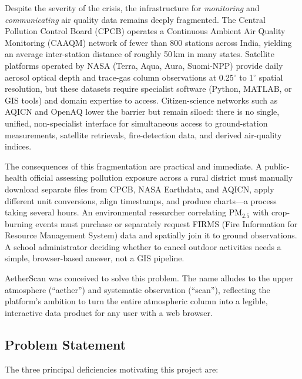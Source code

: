 \documentclass[12pt,a4paper]{article}
\begin{document}
Despite the severity of the crisis, the infrastructure for \emph{monitoring}
and \emph{communicating} air quality data remains deeply fragmented. The
Central Pollution Control Board (CPCB) operates a Continuous Ambient Air
Quality Monitoring (CAAQM) network of fewer than 800 stations across India,
yielding an average inter-station distance of roughly 50\,km in many states.
Satellite platforms operated by NASA (Terra, Aqua, Aura, Suomi-NPP) provide
daily aerosol optical depth and trace-gas column observations at 0.25$^\circ$
to 1$^\circ$ spatial resolution, but these datasets require specialist software
(Python, MATLAB, or GIS tools) and domain expertise to access. Citizen-science
networks such as AQICN and OpenAQ lower the barrier but remain siloed: there
is no single, unified, non-specialist interface for simultaneous access to
ground-station measurements, satellite retrievals, fire-detection data, and
derived air-quality indices.

The consequences of this fragmentation are practical and immediate. A public-health
official assessing pollution exposure across a rural district must manually download
separate files from CPCB, NASA Earthdata, and AQICN, apply different unit
conversions, align timestamps, and produce charts---a process taking several hours.
An environmental researcher correlating $\text{PM}_{2.5}$ with crop-burning events
must purchase or separately request FIRMS (Fire Information for Resource
Management System) data and spatially join it to ground observations. A school
administrator deciding whether to cancel outdoor activities needs a simple,
browser-based answer, not a GIS pipeline.

AetherScan was conceived to solve this problem. The name alludes to the upper
atmosphere (``aether'') and systematic observation (``scan''), reflecting the
platform's ambition to turn the entire atmospheric column into a legible,
interactive data product for any user with a web browser.

\subsection{Problem Statement}
\label{sec:intro:problem}

The three principal deficiencies motivating this project are:
\end{document}
